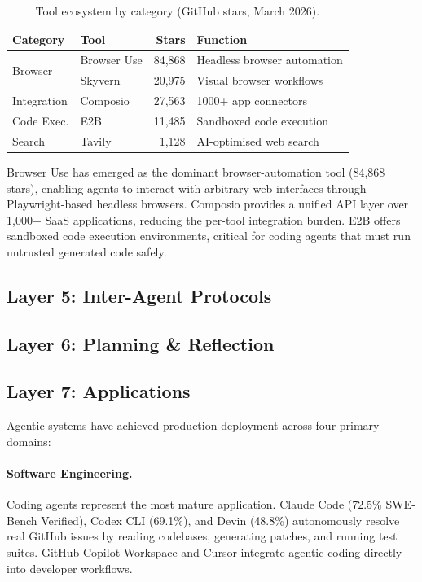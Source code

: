 \documentclass[12pt, a4paper]{article}
\begin{document}
\begin{table}[ht]
\centering
\caption{Tool ecosystem by category (GitHub stars, March 2026).}
\label{tab:tools}
\begin{tabular}{llrl}
\toprule
\textbf{Category} & \textbf{Tool} & \textbf{Stars} & \textbf{Function} \\
\midrule
\multirow{2}{*}{Browser}     & Browser Use & 84,868 & Headless browser automation \\
                              & Skyvern     & 20,975 & Visual browser workflows \\
\midrule
Integration                   & Composio    & 27,563 & 1000+ app connectors \\
\midrule
Code Exec.                    & E2B         & 11,485 & Sandboxed code execution \\
\midrule
Search                        & Tavily      & 1,128  & AI-optimised web search \\
\bottomrule
\end{tabular}
\end{table}

Browser Use has emerged as the dominant browser-automation tool (84,868 stars), enabling agents to interact with arbitrary web interfaces through Playwright-based headless browsers. Composio provides a unified API layer over 1,000+ SaaS applications, reducing the per-tool integration burden. E2B offers sandboxed code execution environments, critical for coding agents that must run untrusted generated code safely.

\subsection{Layer 5: Inter-Agent Protocols}

\subsection{Layer 6: Planning \& Reflection}

\subsection{Layer 7: Applications}
Agentic systems have achieved production deployment across four primary domains:

\paragraph{Software Engineering.} Coding agents represent the most mature application. Claude Code (72.5\% SWE-Bench Verified), Codex CLI (69.1\%), and Devin (48.8\%) autonomously resolve real GitHub issues by reading codebases, generating patches, and running test suites. GitHub Copilot Workspace and Cursor integrate agentic coding directly into developer workflows.
\end{document}
